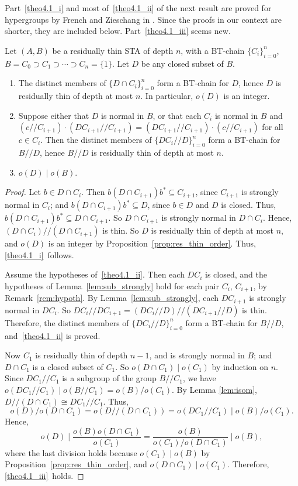 Part~\ref{theo4.1_i}  and most of~\ref{theo4.1_ii} of the next result are proved for hypergroups by
French and Zieschang in
\cite [Theorem~6.3]{FZ}. Since the proofs in our context are 
shorter, they are included below. Part~\ref{theo4.1_iii} seems new.

\begin{thm}
\label{thm:res_thin_sub_quo}
Let $(A, B)$ be a residually thin STA of depth $n$, with a BT-chain
$\{C_i\}_{i=0}^n$, $B = C_0 \supset C_1 \supset \cdots \supset C_n =
\{1\}$. Let $D$ be any closed subset of $B$.
\begin{enumerate}[label = \textup{(}\roman*\textup{)}] 
\item\label{theo4.1_i} The distinct members of $\{D\cap C_i\}_{i=0}^n$ form a BT-chain for $D$,
hence $D$ is residually thin of depth at most $n$. In particular,
$o(D)$ is an integer.
\item\label{theo4.1_ii} Suppose either that $D$ is normal in $B$, or that each $C_i$ is normal in $B$
and $(c//C_{i+1})\cdot(DC_{i+1}//C_{i+1}) =
(DC_{i+1}//C_{i+1})\cdot(c//C_{i+1})$ for all $c \in C_i$. Then the distinct members of
$\{DC_i//D\}_{i=0}^n$ form a BT-chain for $B//D$, hence $B//D$ is
residually thin of depth at most $n$.
\item\label{theo4.1_iii} $o(D) \mid o(B)$.
\end{enumerate}
\end{thm}

\begin{proof}
Let $b \in D\cap C_i$. Then $b(D\cap C_{i+1})b^* \subseteq C_{i+1}$,
since $C_{i+1}$ is strongly normal in $C_i$; and $b(D\cap C_{i+1})b^* \subseteq
D$, since $b \in D$ and $D$ is closed. Thus, $b(D\cap C_{i+1})b^*
\subseteq D\cap C_{i+1}$. So $D\cap C_{i+1}$ is strongly normal in $D\cap
C_i$. Hence, $(D\cap C_i)//(D\cap C_{i+1})$ is thin. So $D$ is
residually thin of depth at most $n$, and $o(D)$ is an integer by
Proposition~\ref{prop:res_thin_order}. Thus, \ref{theo4.1_i}~follows.

Assume the hypotheses of~\ref{theo4.1_ii}. Then each $DC_i$ is closed, and the
hypotheses of Lemma~\ref{lem:sub_strongly} hold for each pair $C_i$,
$C_{i+1}$, by Remark~\ref{rem:hypoth}. By 
Lemma~\ref{lem:sub_strongly}, each $DC_{i+1}$ is strongly normal in
$DC_i$. So $DC_i//DC_{i+1} = (DC_i//D)//(DC_{i+1}//D)$ is thin.
Therefore, the distinct members of $\{DC_i//D\}_{i=0}^n$ form a BT-chain
for $B//D$, and~\ref{theo4.1_ii} is proved.

Now $C_1$ is residually thin of depth $n-1$, and is strongly normal in
$B$; and $D\cap C_1$ is a closed
subset of $C_1$. So $o(D\cap C_1) \mid o(C_1)$ by induction on
$n$. Since $DC_1//C_1$ is a subgroup of the group $B//C_1$, we have
$o(DC_1//C_1) \mid o(B//C_1) = o(B)/o(C_1)$. By Lemma
\ref{lem:isom}, $D//(D\cap C_1) \cong DC_1//C_1$. Thus,
\[
o(D)/o(D\cap C_1) = o(D//(D\cap C_1)) = o(DC_1//C_1) \mid 
o(B)/o(C_1).
\]
Hence, 
\[
o(D) \mid \frac{o(B)o(D\cap C_1)}{o(C_1)} =
\frac{o(B)}{o(C_1)/o(D\cap C_1)} \mid o(B),
\]
where the last division holds because $o(C_1) \mid o(B)$ by
Proposition~\ref{prop:res_thin_order}, and $o(D\cap C_1) \mid 
o(C_1)$. Therefore, \ref{theo4.1_iii}~holds. 
\end{proof}

